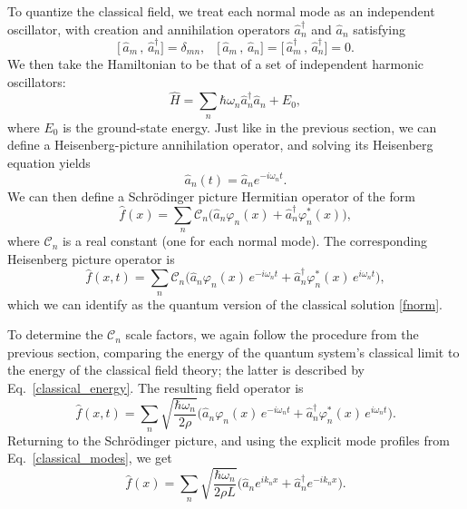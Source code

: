 \documentclass[pra,12pt]{revtex4}
\begin{document}
To quantize the classical field, we treat each normal mode as an
independent oscillator, with creation and annihilation operators
$\hat{a}_n^\dagger$ and $\hat{a}_n$ satisfying
\begin{equation}
  \big[\,\hat{a}_m\,,\, \hat{a}_n^\dagger\big] = \delta_{mn}, \;\;\;
  \big[\,\hat{a}_m\,,\, \hat{a}_n\big] =
  \big[\,\hat{a}_m^\dagger\,,\, \hat{a}_n^\dagger\big] = 0.
\end{equation}
We then take the Hamiltonian to be that of a set of independent
harmonic oscillators:
\begin{equation}
  \hat{H} = \sum_n \hbar \omega_n \hat{a}_n^\dagger \hat{a}_n + E_0,
\end{equation}
where $E_0$ is the ground-state energy.  Just like in the previous
section, we can define a Heisenberg-picture annihilation operator, and
solving its Heisenberg equation yields
\begin{equation}
  \hat{a}_n(t) = \hat{a}_n e^{-i\omega_n t}.
\end{equation}
We can then define a Schr\"odinger picture Hermitian operator of the
form
\begin{equation}
  \hat{f}(x) = \sum_n \mathcal{C}_n \Big(\hat{a}_n \varphi_n(x)
  + \hat{a}_n^\dagger \varphi_n^*(x) \Big),
\end{equation}
where $\mathcal{C}_n$ is a real constant (one for each normal mode).
The corresponding Heisenberg picture operator is
\begin{equation}
  \hat{f}(x,t) = \sum_n \mathcal{C}_n \Big(\hat{a}_n \varphi_n(x) \,e^{-i\omega_nt}
  + \hat{a}_n^\dagger \varphi_n^*(x) \, e^{i\omega_nt} \Big),
\end{equation}
which we can identify as the quantum version of the classical solution
\eqref{fnorm}.

To determine the $\mathcal{C}_n$ scale factors, we again follow the
procedure from the previous section, comparing the energy of the
quantum system's classical limit to the energy of the classical field
theory; the latter is described by Eq.~\eqref{classical_energy}.  The
resulting field operator is
\begin{equation}
  \hat{f}(x,t) = \sum_n \sqrt{\frac{\hbar\omega_n}{2\rho}}
  \Big(\hat{a}_n \varphi_n(x) \,e^{-i\omega_nt}
  + \hat{a}_n^\dagger \varphi_n^*(x) \, e^{i\omega_nt} \Big).
\end{equation}
Returning to the Schr\"odinger picture, and using the explicit mode
profiles from Eq.~\eqref{classical_modes}, we get
\begin{equation}
  \hat{f}(x) = \sum_n \sqrt{\frac{\hbar\omega_n}{2\rho L}}
  \Big(\hat{a}_n e^{ik_n x}
  + \hat{a}_n^\dagger e^{-ik_n x} \Big).
\end{equation}
\end{document}
